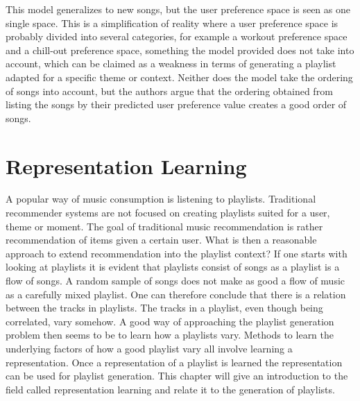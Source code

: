 \documentclass[a4paper,11pt]{kth-mag}
\begin{document}
This model generalizes to new songs, but the user preference space is seen as one single space. This is a simplification of reality where a user preference space is probably divided into several categories, for example a workout preference space and a chill-out preference space, something the model provided does not take into account, which can be claimed as a weakness in terms of generating a playlist adapted for a specific theme or context. Neither does the model take the ordering of songs into account, but the authors argue that the ordering obtained from listing the songs by their predicted user preference value creates a good order of songs\cite{platt2001learning}.

\chapter{Representation Learning}
A popular way of music consumption is listening to playlists. Traditional recommender systems are not focused on creating playlists suited for a user, theme or moment. The goal of traditional music recommendation is rather recommendation of items given a certain user. What is then a reasonable approach to extend recommendation into the playlist context? If one starts with looking at playlists it is evident that playlists consist of songs as a playlist is a flow of songs. A random sample of songs does not make as good a flow of music as a carefully mixed playlist. One can therefore conclude that there is a relation between the tracks in playlists. The tracks in a playlist, even though being correlated, vary somehow. A good way of approaching the playlist generation problem then seems to be to learn how a playlists vary. Methods to learn the underlying factors of how a good playlist vary all involve learning a representation. Once a representation of a playlist is learned the representation can be used for playlist generation. This chapter will give an introduction to the field called representation learning and relate it to the generation of playlists.
\end{document}
